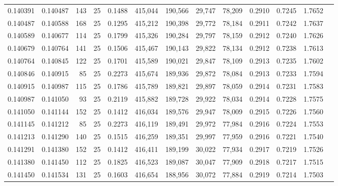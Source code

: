 \begin{tabular}{rrrrrrrrrrrrr}
0.140391 & 0.140487 &   143 &  25 &                                     0.1488 & 415,044 & 190,566 &  29,747 &  78,209 & 0.2910 & 0.7245 & 1.7652 \\
0.140487 & 0.140588 &   168 &  25 &                                     0.1295 & 415,212 & 190,398 &  29,772 &  78,184 & 0.2911 & 0.7242 & 1.7637 \\
0.140589 & 0.140677 &   114 &  25 &                                     0.1799 & 415,326 & 190,284 &  29,797 &  78,159 & 0.2912 & 0.7240 & 1.7626 \\
0.140679 & 0.140764 &   141 &  25 &                                     0.1506 & 415,467 & 190,143 &  29,822 &  78,134 & 0.2912 & 0.7238 & 1.7613 \\
0.140764 & 0.140845 &   122 &  25 &                                     0.1701 & 415,589 & 190,021 &  29,847 &  78,109 & 0.2913 & 0.7235 & 1.7602 \\
0.140846 & 0.140915 &    85 &  25 &                                     0.2273 & 415,674 & 189,936 &  29,872 &  78,084 & 0.2913 & 0.7233 & 1.7594 \\
0.140915 & 0.140987 &   115 &  25 &                                     0.1786 & 415,789 & 189,821 &  29,897 &  78,059 & 0.2914 & 0.7231 & 1.7583 \\
0.140987 & 0.141050 &    93 &  25 &                                     0.2119 & 415,882 & 189,728 &  29,922 &  78,034 & 0.2914 & 0.7228 & 1.7575 \\
0.141050 & 0.141144 &   152 &  25 &                                     0.1412 & 416,034 & 189,576 &  29,947 &  78,009 & 0.2915 & 0.7226 & 1.7560 \\
0.141145 & 0.141212 &    85 &  25 &                                     0.2273 & 416,119 & 189,491 &  29,972 &  77,984 & 0.2916 & 0.7224 & 1.7553 \\
0.141213 & 0.141290 &   140 &  25 &                                     0.1515 & 416,259 & 189,351 &  29,997 &  77,959 & 0.2916 & 0.7221 & 1.7540 \\
0.141291 & 0.141380 &   152 &  25 &                                     0.1412 & 416,411 & 189,199 &  30,022 &  77,934 & 0.2917 & 0.7219 & 1.7526 \\
0.141380 & 0.141450 &   112 &  25 &                                     0.1825 & 416,523 & 189,087 &  30,047 &  77,909 & 0.2918 & 0.7217 & 1.7515 \\
0.141450 & 0.141534 &   131 &  25 &                                     0.1603 & 416,654 & 188,956 &  30,072 &  77,884 & 0.2919 & 0.7214 & 1.7503 \\

\end{tabular}
